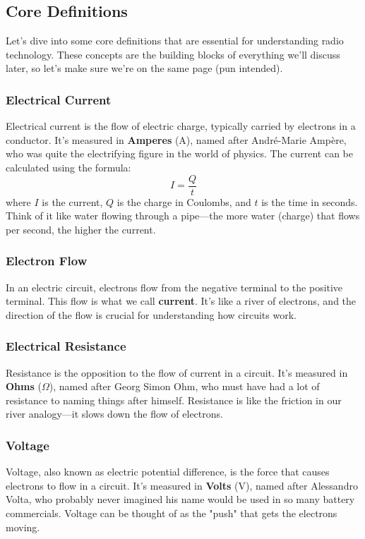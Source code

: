 \subsection{Core Definitions}
\label{subsec:core-defs}

Let's dive into some core definitions that are essential for understanding radio technology. These concepts are the building blocks of everything we'll discuss later, so let's make sure we're on the same page (pun intended).

\subsubsection*{Electrical Current}
Electrical current is the flow of electric charge, typically carried by electrons in a conductor. It's measured in \textbf{Amperes} (A), named after André-Marie Ampère, who was quite the electrifying figure in the world of physics. The current can be calculated using the formula:
\begin{equation}
    I = \frac{Q}{t}
    \label{eq:current}
\end{equation}
where \( I \) is the current, \( Q \) is the charge in Coulombs, and \( t \) is the time in seconds. Think of it like water flowing through a pipe—the more water (charge) that flows per second, the higher the current.

\subsubsection*{Electron Flow}
In an electric circuit, electrons flow from the negative terminal to the positive terminal. This flow is what we call \textbf{current}. It's like a river of electrons, and the direction of the flow is crucial for understanding how circuits work. 

\subsubsection*{Electrical Resistance}
Resistance is the opposition to the flow of current in a circuit. It's measured in \textbf{Ohms} (\(\Omega\)), named after Georg Simon Ohm, who must have had a lot of resistance to naming things after himself. Resistance is like the friction in our river analogy—it slows down the flow of electrons.

\subsubsection*{Voltage}
Voltage, also known as electric potential difference, is the force that causes electrons to flow in a circuit. It's measured in \textbf{Volts} (V), named after Alessandro Volta, who probably never imagined his name would be used in so many battery commercials. Voltage can be thought of as the "push" that gets the electrons moving.


